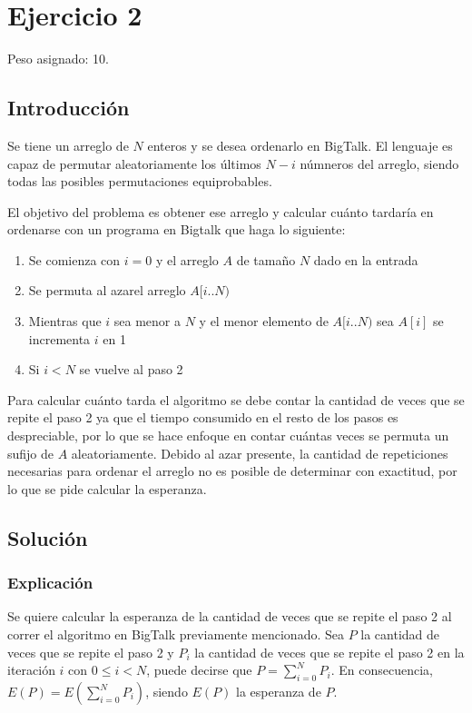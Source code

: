 \section{Ejercicio 2}

Peso asignado: 10.

\subsection{Introducción}

Se tiene un arreglo de $N$ enteros y se desea ordenarlo en BigTalk. El
lenguaje es capaz de permutar aleatoriamente los últimos $N - i$ númneros del
arreglo, siendo todas las posibles permutaciones equiprobables.

El objetivo del problema es obtener ese arreglo y calcular cuánto tardaría en
ordenarse con un programa en Bigtalk que haga lo siguiente:

\begin{enumerate}
\item Se comienza con $i = 0$ y el arreglo $A$ de tamaño $N$ dado en la
entrada
\item Se permuta al azarel arreglo $A[i..N)$
\item Mientras que $i$ sea menor a $N$ y el menor elemento de $A[i..N)$ sea
$A[i]$ se incrementa $i$ en 1
\item Si $i < N$ se vuelve al paso 2
\end{enumerate}

Para calcular cuánto tarda el algoritmo se debe contar la cantidad de veces
que se repite el paso 2 ya que el tiempo consumido en el resto de los pasos es
despreciable, por lo que se hace enfoque en contar cuántas veces se permuta un
sufijo de $A$ aleatoriamente. Debido al azar presente, la cantidad de
repeticiones necesarias para ordenar el arreglo no es posible de determinar
con exactitud, por lo que se pide calcular la esperanza.

\subsection{Solución}

\subsubsection{Explicación}

Se quiere calcular la esperanza de la cantidad de veces que se repite el paso
2 al correr el algoritmo en BigTalk previamente mencionado. Sea $P$ la
cantidad de veces que se repite el paso 2 y $P_i$ la cantidad de veces que se
repite el paso 2 en la iteración $i$ con $0 \leq i < N$, puede decirse que
$P = \sum_{i = 0}^{N}{P_i}$. En consecuencia,
$E(P) = E(\sum_{i = 0}^{N}{P_i})$, siendo $E(P)$ la esperanza de $P$.

